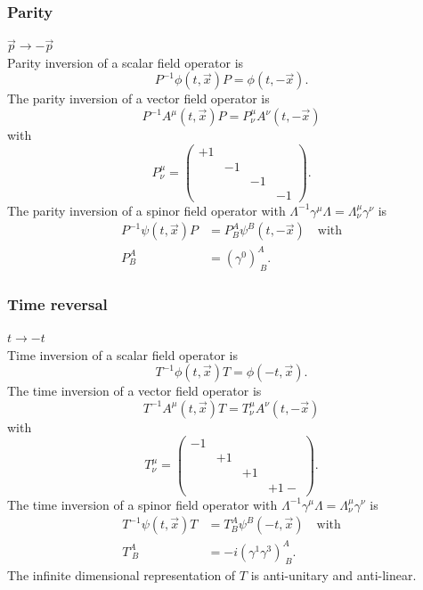 \subsubsection{Parity}
$\vec{p}\rightarrow - \vec{p}$\\
Parity inversion of a scalar field operator is
\begin{equation}
	P^{-1} \phi(t,\vec{x}) P = \phi(t,-\vec{x}).
\end{equation}
The parity inversion of a vector field operator is
\begin{equation}
	P^{-1}A^\mu(t,\vec{x})P = P^\mu_\nu A^\nu(t,-\vec{x})
\end{equation}
with
\begin{equation}
P^\mu_\nu = 
\begin{pmatrix}
+1&&&\\&-1&&\\
&&-1&\\
&&&-1
\end{pmatrix}.
\end{equation}
The parity inversion of a spinor field operator with $\Lambda^{-1} \gamma^\mu \Lambda = \Lambda^\mu_\nu \gamma^\nu$ is
\begin{align}
	P^{-1}\psi(t,\vec{x})P &= P^A_B \psi^B(t,-\vec{x})\quad \mathrm{with}\\
	P^A_B&=(\gamma^0)^A_{\;B}.
\end{align}

\subsubsection{Time reversal}
$t\rightarrow-t$\\
Time inversion of a scalar field operator is
\begin{equation}
	T^{-1} \phi(t,\vec{x}) T = \phi(-t,\vec{x}).
\end{equation}
The time inversion of a vector field operator is
\begin{equation}
	T^{-1} A^\mu(t,\vec{x})T = T^\mu_\nu A^\nu(t,-\vec{x})
\end{equation}
with
\begin{equation}
T^\mu_\nu=
\begin{pmatrix}
-1&&&\\&+1&&\\
&&+1&\\
&&&+1-
\end{pmatrix}.
\end{equation}
The time inversion of a spinor field operator with $\Lambda^{-1} \gamma^\mu \Lambda = \Lambda^\mu_\nu \gamma^\nu$ is
\begin{align}
	T^{-1}\psi(t,\vec{x}) T &= T^A_B \psi^B(-t,\vec{x})\quad \mathrm{with}\\
	T^A_{\;B} &=-i(\gamma^1\gamma^3)^A_{\;B}.
\end{align}
The infinite dimensional representation of $T$ is anti-unitary and anti-linear.
